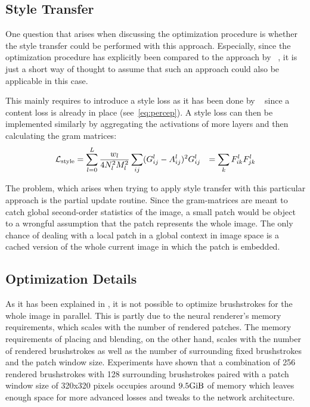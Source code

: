 \subsection{Style Transfer}

One question that arises when discussing the optimization procedure is whether the style transfer could be performed with this approach.
Especially, since the optimization procedure has explicitly been compared to the approach by \citeauthor*{Gatys}~\cite{Gatys}, it is just a short way of thought to assume that such an approach could also be applicable in this case.

This mainly requires to introduce a style loss as it has been done by \citeauthor*{Gatys}~\cite{Gatys} since a content loss is already in place (see~\eqref{eq:percep}).
A style loss can then be implemented similarly by aggregating the activations of more layers and then calculating the gram matrices:
\begin{align}
    \mathcal{L}_{\text{style}} & = \sum_{l=0}^L \frac{w_l}{4 N^2_l M^2_l} \sum_{ij} (G_{ij}^l - A_{ij}^l)^2
    G_{ij}^l & = \sum_k F_{ik}^l F_{jk}^l
\end{align}

The problem, which arises when trying to apply style transfer with this particular approach is the partial update routine.
Since the gram-matrices are meant to catch global second-order statistics of the image, a small patch would be object to a wrongful assumption that the patch represents the whole image.
The only chance of dealing with a local patch in a global context in image space is a cached version of the whole current image in which the patch is embedded.

\subsection{Optimization Details}

As it has been explained in , it is not possible to optimize brushstrokes for the whole image in parallel.
This is partly due to the neural renderer's memory requirements, which scales with the number of rendered patches.
The memory requirements of placing and blending, on the other hand, scales with the number of rendered brushstrokes as well as the number of surrounding fixed brushstrokes and the patch window size.
Experiments have shown that a combination of 256 rendered brushstrokes with 128 surrounding brushstrokes paired with a patch window size of 320x320 pixels occupies around $9.5 \si{\gibi \byte}$ of memory which leaves enough space for more advanced losses and tweaks to the network architecture.

